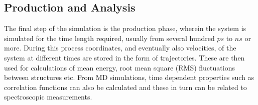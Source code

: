 \subsection{Production and Analysis}

The final step of the simulation is the production phase, wherein the system is simulated for the time length required, usually from several hundred $ps$ to $ns$ or more. During this process coordinates,  and eventually also velocities, of the system at different times are stored in the form of trajectories. These are then used for calculations of mean energy, root mean square (RMS) fluctuations between structures etc. From MD simulations, time dependent properties such as correlation functions can also be calculated and these in turn can be related to spectroscopic measurements.



